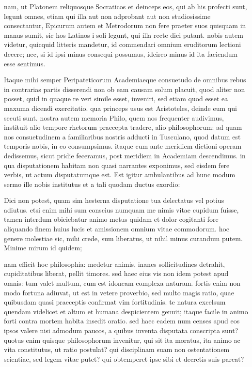 nam, ut Platonem reliquosque Socraticos et deinceps eos, qui ab his profecti sunt, legunt omnes, etiam qui illa aut non adprobant aut non studiosissime consectantur, Epicurum autem et Metrodorum non fere praeter suos quisquam in manus sumit, sic hos Latinos i soli legunt, qui illa recte dici putant. nobis autem videtur, quicquid litteris mandetur, id commendari omnium eruditorum lectioni decere; nec, si id ipsi minus consequi possumus, idcirco minus id ita faciendum esse sentimus.

 Itaque mihi semper Peripateticorum Academiaeque consuetudo de omnibus rebus in contrarias partis disserendi non ob eam causam solum placuit, quod aliter non posset, quid in quaque re veri simile esset, inveniri, sed etiam quod esset ea maxuma dicendi exercitatio. qua princeps usus est Aristoteles, deinde eum qui secuti sunt. nostra autem memoria Philo, quem nos frequenter audivimus, instituit alio tempore rhetorum praecepta tradere, alio philosophorum: ad quam nos consuetudinem a familiaribus nostris adducti in Tusculano, quod datum est temporis nobis, in eo consumpsimus. itaque cum ante meridiem dictioni operam dedissemus, sicut pridie feceramus, post meridiem in Academiam descendimus. in qua disputationem habitam non quasi narrantes exponimus, sed eisdem fere verbis, ut actum disputatumque est. Est igitur ambulantibus ad hunc modum sermo ille nobis institutus et a tali quodam ductus exordio:

 Dici non potest, quam sim hesterna disputatione tua delectatus vel potius adiutus. etsi enim mihi sum conscius numquam me nimis vitae cupidum fuisse, tamen interdum obiciebatur animo metus quidam et dolor cogitanti fore aliquando finem huius lucis et amissionem omnium vitae commodorum. hoc genere molestiae sic, mihi crede, sum liberatus, ut nihil minus curandum putem. Minime mirum id quidem;

 nam efficit hoc philosophia: medetur animis, inanes sollicitudines detrahit, cupiditatibus liberat, pellit timores. sed haec eius vis non idem potest apud omnis: tum valet multum, cum est idoneam complexa naturam. fortis enim non modo fortuna adiuvat, ut est in vetere proverbio, sed multo magis ratio, quae quibusdam quasi praeceptis confirmat vim fortitudinis. te natura excelsum quendam videlicet et altum et humana despicientem genuit; itaque facile in animo forti contra mortem habita insedit oratio. sed haec eadem num censes apud eos ipsos valere nisi admodum paucos, a quibus inventa disputata conscripta sunt? quotus enim quisque philosophorum invenitur, qui sit ita moratus, ita animo ac vita constitutus, ut ratio postulat? qui disciplinam suam non ostentationem scientiae, sed legem vitae putet? qui obtemperet ipse sibi et decretis suis pareat?

